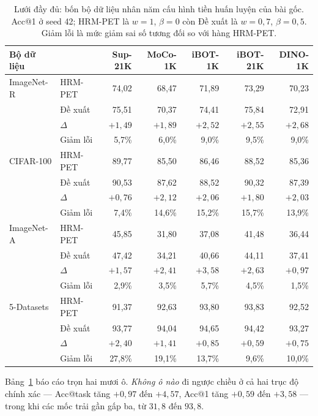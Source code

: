 \documentclass[runningheads]{llncs}
\begin{document}
\begin{table}
\caption{Lưới đầy đủ: bốn bộ dữ liệu nhân năm cấu hình tiền huấn luyện của bài
gốc. Acc@1 ở seed 42; HRM-PET là $w=1$, $\beta=0$ còn Đề xuất là $w=0{,}7$,
$\beta=0{,}5$. Giảm lỗi là mức giảm sai số tương đối so với hàng HRM-PET.}
\label{tab:grid}
\begin{tabular}{llrrrrr}
\hline
Bộ dữ liệu & & Sup-21K & MoCo-1K & iBOT-1K & iBOT-21K & DINO-1K\\
\hline
ImageNet-R & HRM-PET  & 74,02 & 68,47 & 71,89 & 73,29 & 70,23\\
           & Đề xuất  & 75,51 & 70,37 & 74,41 & 75,84 & 72,91\\
           & $\Delta$ & $+1{,}49$ & $+1{,}89$ & $+2{,}52$ & $+2{,}55$ & $+2{,}68$\\
           & Giảm lỗi & 5,7\% & 6,0\% & 9,0\% & 9,5\% & 9,0\%\\
\hline
CIFAR-100  & HRM-PET  & 89,77 & 85,50 & 86,46 & 88,52 & 85,36\\
           & Đề xuất  & 90,53 & 87,62 & 88,52 & 90,32 & 87,39\\
           & $\Delta$ & $+0{,}76$ & $+2{,}12$ & $+2{,}06$ & $+1{,}80$ & $+2{,}03$\\
           & Giảm lỗi & 7,4\% & 14,6\% & 15,2\% & 15,7\% & 13,9\%\\
\hline
ImageNet-A & HRM-PET  & 45,85 & 31,80 & 37,08 & 41,48 & 36,44\\
           & Đề xuất  & 47,42 & 34,21 & 40,66 & 44,11 & 37,41\\
           & $\Delta$ & $+1{,}57$ & $+2{,}41$ & $+3{,}58$ & $+2{,}63$ & $+0{,}97$\\
           & Giảm lỗi & 2,9\% & 3,5\% & 5,7\% & 4,5\% & 1,5\%\\
\hline
5-Datasets & HRM-PET  & 91,37 & 92,63 & 93,80 & 93,83 & 92,52\\
           & Đề xuất  & 93,77 & 94,04 & 94,65 & 94,42 & 93,27\\
           & $\Delta$ & $+2{,}40$ & $+1{,}41$ & $+0{,}85$ & $+0{,}59$ & $+0{,}75$\\
           & Giảm lỗi & 27,8\% & 19,1\% & 13,7\% & 9,6\% & 10,0\%\\
\hline
\end{tabular}
\end{table}

Bảng~\ref{tab:grid} báo cáo trọn hai mươi ô. \emph{Không ô nào} đi ngược chiều ở
cả hai trục độ chính xác --- Acc@task tăng $+0{,}97$ đến $+4{,}57$, Acc@1 tăng
$+0{,}59$ đến $+3{,}58$ --- trong khi các mốc trải gần gấp ba, từ $31{,}8$ đến
$93{,}8$.
\end{document}
